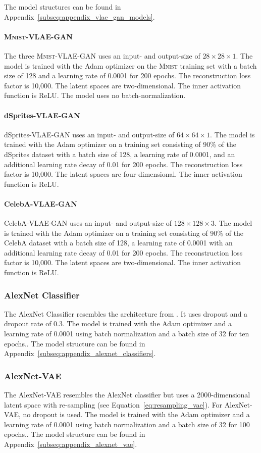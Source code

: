 The model structures can be found in Appendix~\ref{subseq:appendix_vlae_gan_models}.

\paragraph{\textsc{Mnist}-\ac{VLAE}-\ac{GAN}} The three \textsc{Mnist}-\ac{VLAE}-\ac{GAN} uses an input- and output-size of $28\times 28\times 1$.
The model is trained with the Adam optimizer on the \textsc{Mnist} training set with a batch size of 128 and a learning rate of 0.0001 for 200 epochs.
The reconstruction loss factor is 10,000.
The latent spaces are two-dimensional.
The inner activation function is ReLU.
The model uses no batch-normalization.

\paragraph{dSprites-\ac{VLAE}-\ac{GAN}} dSprites-\ac{VLAE}-\ac{GAN} uses an input- and output-size of $64\times 64\times 1$.
The model is trained with the Adam optimizer on a training set consisting of 90\% of the dSprites dataset with a batch size of 128, a learning rate of 0.0001, and an additional learning rate decay of 0.01 for 200 epochs.
The reconstruction loss factor is 10,000.
The latent spaces are four-dimensional.
The inner activation function is ReLU.

\paragraph{CelebA-\ac{VLAE}-\ac{GAN}} CelebA-\ac{VLAE}-\ac{GAN} uses an input- and output-size of $128\times 128\times 3$.
The model is trained with the Adam optimizer on a training set consisting of 90\% of the CelebA dataset with a batch size of 128, a learning rate of 0.0001 with an additional learning rate decay of 0.01 for 200 epochs.
The reconstruction loss factor is 10,000.
The latent spaces are two-dimensional.
The inner activation function is ReLU.

\subsubsection{AlexNet Classifier}\label{subsubsec:alexnet_classifier}
The AlexNet Classifier resembles the architecture from \citet{krizhevsky2012imagenet}.
It uses dropout and a dropout rate of 0.3.
The model is trained with the Adam optimizer and a learning rate of 0.0001 using batch normalization and a batch size of 32 for ten epochs..
The model structure can be found in Appendix~\ref{subseq:appendix_alexnet_classifiers}.

\subsubsection{AlexNet-VAE}\label{subsubsec:alexnet_vae}
The AlexNet-\ac{VAE} resembles the AlexNet classifier but uses a 2000-dimensional latent space with re-sampling (see Equation~\ref{eq:resampling_vae}).
For AlexNet-\ac{VAE}, no dropout is used.
The model is trained with the Adam optimizer and a learning rate of 0.0001 using batch normalization and a batch size of 32 for 100 epochs..
The model structure can be found in Appendix~\ref{subseq:appendix_alexnet_vae}.